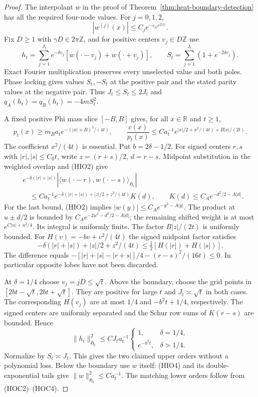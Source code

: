 \documentclass[11pt]{article}
\theoremstyle{remark}\newtheorem{remark}[theorem]{Remark}
\newcommand{\R}{\mathbb R}
\newcommand{\Z}{\mathbb Z}
\begin{document}
\begin{proof}
The interpolant $w$ in the proof of
Theorem~\ref{thm:heat-boundary-detection} has all the required
four-node values. For $j=0,1,2$,
\[
 |w^{(j)}(x)|\le C_j e^{-c_we^{2|x|}}.                       \tag{HIO2}
\]
Fix $D\ge1$ with $\gamma D\in2\pi\Z$, and for positive centers
$v_j\in D\Z$ use
\[
 h_t=\sum_{j=1}^{J_t}e^{-\delta v_j}
             [w(\cdot-v_j)+w(\cdot+v_j)],\qquad
 S_t=\sum_{j=1}^{J_t}(1+e^{-2\delta v_j}).                   \tag{HIO3}
\]
Exact Fourier multiplication preserves every unselected value and
both poles. Phase locking gives values $S_t,-S_t$ at the positive
pair and the stated parity values at the negative pair. Thus
$J_t\le S_t\le2J_t$ and $q_A(h_t)=q_B(h_t)=-4mS_t^2$.

A fixed positive Phi mass slice $[-B,B]$ gives, for all $x\in\R$ and $t\ge1$,
\[
 p_t(x)\ge m_Ba_te^{-(|x|+B)^2/(4t)},\qquad
 \frac{c(x)}{p_t(x)}\le Ca_t^{-1}
              e^{|x|/2+x^2/(4t)+B|x|/(2t)}.                  \tag{HIO4}
\]
The coefficient $x^2/(4t)$ is essential. Put $b=2\delta-1/2$.
For signed centers $r,s$ with $|r|,|s|\le C_0t$, write
$z=(r+s)/2$, $d=r-s$. Midpoint substitution in the weighted overlap
and (HIO2) give
\[
\begin{split}
 &e^{-\delta(|r|+|s|)}
    |\langle w(\cdot-r),w(\cdot-s)\rangle_{\mathfrak H_t}|\\
 &\quad\le Ca_t^{-1}
    e^{-\delta(|r|+|s|)+|z|/2+z^2/(4t)}K(d),
 \qquad K(d)\le C_Ae^{-d^2/2-A|d|}. 
\end{split}                                                 \tag{HIO5}
\]
For the last bound, (HIO2) implies
$|w(y)|\le C_Ae^{-y^2-A|y|}$. The product at $u\pm d/2$
is bounded by $C_Ae^{-2u^2-d^2/2-A|d|}$; the remaining
shifted weight is at most $e^{C|u|+u^2/4}$. Its integral is
uniformly finite. The factor $B|z|/(2t)$ is uniformly bounded.
For $H(v)=-bv+v^2/(4t)$ the signed midpoint factor satisfies
\[
 -\delta(|r|+|s|)+|z|/2+z^2/(4t)
                     \le\tfrac12[H(|r|)+H(|s|)].             \tag{HIO6}
\]
The difference equals
$-[|r|+|s|-|r+s|]/4-(r-s)^2/(16t)\le0$.
In particular opposite lobes have not been discarded.

At $\delta=1/4$ choose $v_j=jD\le\sqrt t$. Above the boundary,
choose the grid points in $[2bt-\sqrt t,2bt+\sqrt t]$.
They are positive for large $t$ and $J_t\asymp\sqrt t$ in both cases.
The corresponding $H(v_j)$ are at most $1/4$ and $-b^2t+1/4$,
respectively. The signed centers are uniformly separated and the
Schur row sums of $K(r-s)$ are bounded. Hence
\[
 \|h_t\|_{\mathfrak H_t}^2\le CJ_ta_t^{-1}
       \begin{cases}1,&\delta=1/4,\\e^{-b^2t},&\delta>1/4.
       \end{cases}                                         \tag{HIO7}
\]
Normalize by $S_t\asymp J_t$. This gives the two claimed upper
orders without a polynomial loss. Below the boundary use $w$
itself: (HIO4) and its double-exponential tails give
$\|w\|_{\mathfrak H_t}^2\le Ca_t^{-1}$.
The matching lower orders follow from (HOC2)--(HOC4).


\end{proof}
\end{document}
